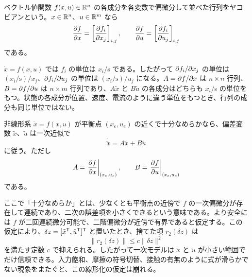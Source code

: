 \begin{definition}[ヤコビアン]
ベクトル値関数 $f(x,u)\in\mathbb{R}^n$ の各成分を各変数で偏微分して並べた行列をヤコビアンという。$x\in\mathbb{R}^n$、$u\in\mathbb{R}^m$ なら
\begin{equation}
  \frac{\partial f}{\partial x}=\left[\frac{\partial f_i}{\partial x_j}\right]_{i,j},
  \qquad
  \frac{\partial f}{\partial u}=\left[\frac{\partial f_i}{\partial u_j}\right]_{i,j}
\end{equation}
である。
\end{definition}

$\dot{x}=f(x,u)$ では $f_i$ の単位は $x_i$/s である。したがって $\partial f_i/\partial x_j$ の単位は $(x_i/\mathrm{s})/x_j$、$\partial f_i/\partial u_j$ の単位は $(x_i/\mathrm{s})/u_j$ になる。$A=\partial f/\partial x$ は $n\times n$ 行列、$B=\partial f/\partial u$ は $n\times m$ 行列であり、$A\tilde{x}$ と $B\tilde{u}$ の各成分はどちらも $x_i$/s の単位をもつ。状態の各成分が位置、速度、電流のように違う単位をもつとき、行列の成分も同じ単位ではない。

\begin{theorem}[一次テイラー展開による線形化]
非線形系 $\dot{x}=f(x,u)$ が平衡点 $(x_e,u_e)$ の近くで十分なめらかなら、偏差変数 $\tilde{x}$、$\tilde{u}$ は一次近似で
\begin{equation}
  \dot{\tilde{x}}=A\tilde{x}+B\tilde{u}
  \label{eq:linearized-model}
\end{equation}
に従う。ただし
\begin{equation}
  A=\left.\frac{\partial f}{\partial x}\right|_{(x_e,u_e)},
  \qquad
  B=\left.\frac{\partial f}{\partial u}\right|_{(x_e,u_e)}
\end{equation}
である。
\end{theorem}

ここで「十分なめらか」とは、少なくとも平衡点の近傍で $f$ の一次偏微分が存在して連続であり、二次の誤差項を小さくできるという意味である。より安全には $f$ が二回連続微分可能で、二階偏微分が近傍で有界であると仮定する。この仮定により、$\delta z=[\tilde{x}^{\mathsf{T}},\tilde{u}^{\mathsf{T}}]^{\mathsf{T}}$ と置いたとき、捨てた項 $r_2(\delta z)$ は
\begin{equation}
  \lVert r_2(\delta z)\rVert \le c\lVert \delta z\rVert^2
\end{equation}
を満たす定数 $c$ で抑えられる。したがって一次モデルは $\tilde{x}$ と $\tilde{u}$ が小さい範囲でだけ信頼できる。入力飽和、摩擦の符号切替、接触の有無のように式が滑らかでない現象をまたぐと、この線形化の仮定は崩れる。

